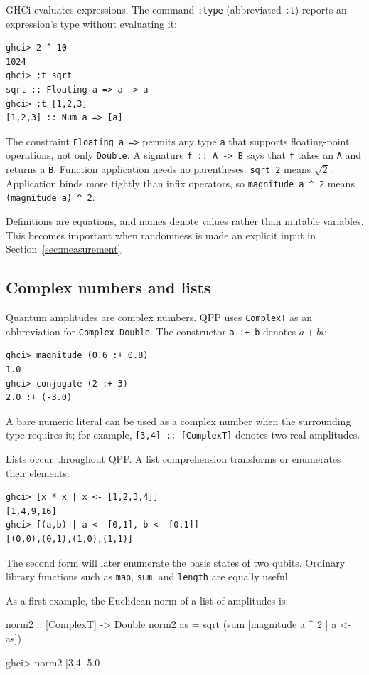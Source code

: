 \documentclass[11pt,a4paper]{article}
\theoremstyle{definition}
\begin{document}
GHCi evaluates expressions.  The command \lstinline|:type| (abbreviated
\lstinline|:t|) reports an expression's type without evaluating it:
\begin{lstlisting}
ghci> 2 ^ 10
1024
ghci> :t sqrt
sqrt :: Floating a => a -> a
ghci> :t [1,2,3]
[1,2,3] :: Num a => [a]
\end{lstlisting}
The constraint \lstinline|Floating a =>| permits any type \lstinline|a| that
supports floating-point operations, not only \lstinline|Double|.
A signature \lstinline|f :: A -> B| says that \lstinline|f| takes an
\lstinline|A| and returns a \lstinline|B|.  Function application needs no
parentheses: \lstinline|sqrt 2| means $\sqrt2$.  Application binds more
tightly than infix operators, so \lstinline|magnitude a ^ 2| means
\lstinline|(magnitude a) ^ 2|.

Definitions are equations, and names denote values rather than mutable
variables.  This becomes important when randomness is made an explicit input
in Section~\ref{sec:measurement}.

\subsection{Complex numbers and lists}

Quantum amplitudes are complex numbers.  QPP uses
\lstinline|ComplexT| as an abbreviation for \lstinline|Complex Double|.
The constructor \lstinline|a :+ b| denotes $a+bi$:
\begin{lstlisting}
ghci> magnitude (0.6 :+ 0.8)
1.0
ghci> conjugate (2 :+ 3)
2.0 :+ (-3.0)
\end{lstlisting}
A bare numeric literal can be used as a complex number when the surrounding
type requires it; for example, \lstinline|[3,4] :: [ComplexT]| denotes two
real amplitudes.

Lists occur throughout QPP.  A list comprehension transforms or enumerates
their elements:
\begin{lstlisting}
ghci> [x * x | x <- [1,2,3,4]]
[1,4,9,16]
ghci> [(a,b) | a <- [0,1], b <- [0,1]]
[(0,0),(0,1),(1,0),(1,1)]
\end{lstlisting}
The second form will later enumerate the basis states of two qubits.
Ordinary library functions such as \lstinline|map|, \lstinline|sum|, and
\lstinline|length| are equally useful.

As a first example, the Euclidean norm of a list of amplitudes is:
\begin{qppcode}
norm2 :: [ComplexT] -> Double
norm2 as = sqrt (sum [magnitude a ^ 2 | a <- as])

ghci> norm2 [3,4]
5.0
\end{qppcode}
\end{document}
